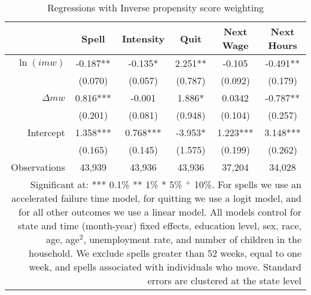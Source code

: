 \documentclass{article}
\begin{document}
\begin{table}
	\centering
	\caption{Regressions with Inverse propensity score weighting}
	\begin{tabular}{rccccc}
		
		&      Spell &  Intensity &       Quit &  Next Wage & Next Hours \\
		\hline
		\hline
		$\ln(imw)$ &   -0.187** &    -0.135* &    2.251** &     -0.105 &   -0.491** \\
		
		&     (0.070) &    (0.057) &    (0.787) &    (0.092) &    (0.179) \\
		
		$\Delta mw$ &   0.816*** &  -0.001 &     1.886* &     0.0342 &   -0.787** \\
		
		&    (0.201) &    (0.081) &    (0.948) &    (0.104) &    (0.257) \\
		
		Intercept &   1.358*** &   0.768*** &    -3.953* &   1.223*** &   3.148*** \\
		
		&    (0.165) &    (0.145) &    (1.575) &    (0.199) &    (0.262) \\\hdashline
		
		Observations &      43,939 &      43,936 &      43,936 &      37,204 &      34,028 \\
		\hline
		\multicolumn{6}{p{.8\textwidth}}{{\footnotesize Significant at: *** 0.1\% ** 1\% * 5\% $^+$ 10\%. For spells we use an accelerated failure time model, for quitting we use a logit model, and for all other outcomes we use a linear model. All models control for state and time (month-year) fixed effects, education level, sex, race, age, age$^2$, unemployment rate, and number of children in the household. We exclude spells greater than 52 weeks, equal to one week, and spells associated with individuals who move. Standard errors are clustered at the state level }}\\
	\end{tabular}  
	\label{tab:robust_wips}
\end{table}
\end{document}
